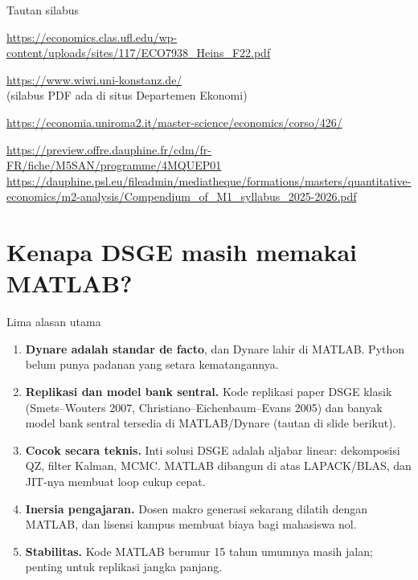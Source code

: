 \documentclass[aspectratio=169,11pt]{beamer}
\begin{document}
\begin{frame}{Tautan silabus}
\footnotesize
\begin{description}
  \item[Florida] \url{https://economics.clas.ufl.edu/wp-content/uploads/sites/117/ECO7938_Heins_F22.pdf}
  \item[Konstanz] \url{https://www.wiwi.uni-konstanz.de/}
        \\ (silabus PDF ada di situs Departemen Ekonomi)
  \item[Tor Vergata] \url{https://economia.uniroma2.it/master-science/economics/corso/426/}
  \item[Dauphine] \url{https://preview.offre.dauphine.fr/cdm/fr-FR/fiche/M5SAN/programme/4MQUEP01}
        \\ \url{https://dauphine.psl.eu/fileadmin/mediatheque/formations/masters/quantitative-economics/m2-analysis/Compendium_of_M1_syllabus_2025-2026.pdf}
\end{description}
\end{frame}

\section{Kenapa DSGE masih memakai MATLAB?}

\begin{frame}{Lima alasan utama}
\begin{enumerate}
  \item \textbf{Dynare adalah standar de facto}, dan Dynare lahir di MATLAB.
        Python belum punya padanan yang setara kematangannya.
  \item \textbf{Replikasi dan model bank sentral.} Kode replikasi paper
        DSGE klasik (Smets--Wouters 2007, Christiano--Eichenbaum--Evans 2005)
        dan banyak model bank sentral tersedia di MATLAB/Dynare
        (tautan di slide berikut).
  \item \textbf{Cocok secara teknis.} Inti solusi DSGE adalah aljabar linear:
        dekomposisi QZ, filter Kalman, MCMC. MATLAB dibangun di atas
        LAPACK/BLAS, dan JIT-nya membuat loop cukup cepat.
  \item \textbf{Inersia pengajaran.} Dosen makro generasi sekarang dilatih
        dengan MATLAB, dan lisensi kampus membuat biaya bagi mahasiswa nol.
  \item \textbf{Stabilitas.} Kode MATLAB berumur 15 tahun umumnya masih jalan;
        penting untuk replikasi jangka panjang.
\end{enumerate}
\end{frame}
\end{document}
